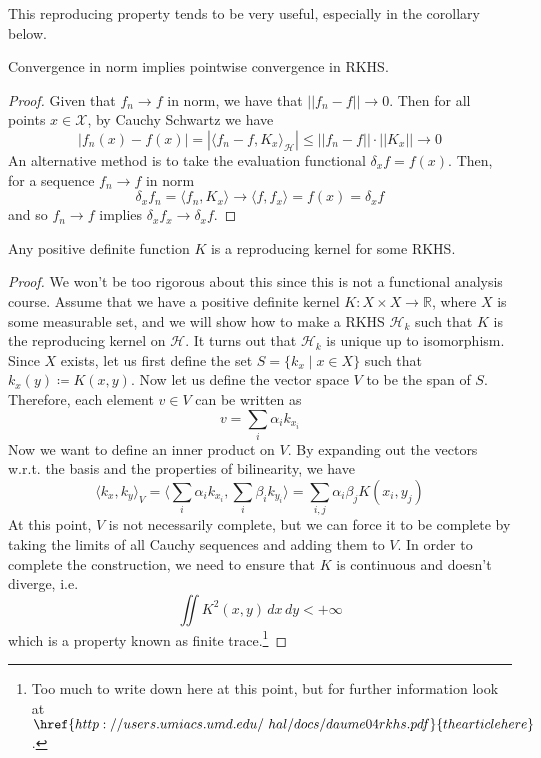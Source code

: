   This reproducing property tends to be very useful, especially in the corollary below. 

  \begin{corollary}
    Convergence in norm implies pointwise convergence in RKHS. 
  \end{corollary}
  \begin{proof}
    Given that $f_n \rightarrow f$ in norm, we have that $||f_n - f|| \rightarrow 0$. Then for all points $x \in \mathcal{X}$, by Cauchy Schwartz we have 
    \begin{equation}
      |f_n(x) - f(x)| = |\langle f_n - f, K_x \rangle_{\mathcal{H}}| \leq ||f_n - f|| \cdot ||K_x|| \rightarrow 0
    \end{equation}
    An alternative method is to take the evaluation functional $\delta_x f = f(x)$. Then, for a sequence $f_n \to f$ in norm
    \begin{equation}
      \delta_x f_n = \langle f_n, K_x \rangle \to \langle f, f_x \rangle = f(x) = \delta_x f
    \end{equation}
    and so $f_n \to f$ implies $\delta_x f_x \to \delta_x f$. 
  \end{proof}

  \begin{theorem} 
    Any positive definite function $K$ is a reproducing kernel for some RKHS.  
  \end{theorem} 
  \begin{proof} 
    We won't be too rigorous about this since this is not a functional analysis course. Assume that we have a positive definite kernel $K: X \times X \rightarrow \mathbb{R}$, where $X$ is some measurable set, and we will show how to make a RKHS $\mathcal{H}_k$ such that $K$ is the reproducing kernel on $\mathcal{H}$. It turns out that $\mathcal{H}_k$ is unique up to isomorphism. Since $X$ exists, let us first define the set $S = \{ k_x \mid x \in X\}$ such that $k_x (y) \coloneqq K(x, y)$. Now let us define the vector space $V$ to be the span of $S$. Therefore, each element $v \in V$ can be written as 
    \[v = \sum_i \alpha_i k_{x_i}\]
    Now we want to define an inner product on $V$. By expanding out the vectors w.r.t. the basis and the properties of bilinearity, we have 
    \[\langle k_x, k_y \rangle_{V} = \bigg\langle \sum_i \alpha_i k_{x_i} , \sum_i \beta_i k_{y_i} \bigg\rangle = \sum_{i, j} \alpha_i \beta_j K(x_i, y_j)\] 
    At this point, $V$ is not necessarily complete, but we can force it to be complete by taking the limits of all Cauchy sequences and adding them to $V$. In order to complete the construction, we need to ensure that $K$ is continuous and doesn't diverge, i.e. 
    \[\iint K^2 (x, y) \,dx\,dy < +\infty\]
    which is a property known as finite trace.\footnote{Too much to write down here at this point, but for further information look at $\href{http://users.umiacs.umd.edu/~hal/docs/daume04rkhs.pdf}{the article here}$.}
  \end{proof}

